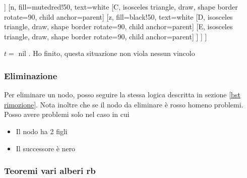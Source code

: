 \begin{itemize}
\begin{minipage}[t]{0.48\linewidth}
\begin{center}
\begin{forest}
				      [p, fill=black!50, text=white
				      [t, fill=mutedred!50, text=white
				      [A, isosceles triangle, draw, shape border rotate=90, child anchor=parent]
				      [B, isosceles triangle, draw, shape border rotate=90, child anchor=parent]
				      ]
				      [n, fill=mutedred!50, text=white
				      [C, isosceles triangle, draw, shape border rotate=90, child anchor=parent]
				      [z, fill=black!50, text=white
				      [D, isosceles triangle, draw, shape border rotate=90, child anchor=parent]
				      [E, isosceles triangle, draw, shape border rotate=90, child anchor=parent]
				      ]
				      ]
				      ]
			      \end{forest}
		      \end{center}
	      \end{minipage}
	      \vskip3mm
	      $ t = \text{ nil } $. Ho finito, questa situazione non viola nessun vincolo
\end{itemize}
\subsubsection{Eliminazione}
Per eliminare un nodo, posso seguire la stessa logica descritta in sezione \ref{bst rimozione}. Nota inoltre che se il nodo da eliminare è rosso homeno problemi. Posso avere problemi solo nel caso in cui
\begin{itemize}
	\item Il nodo ha 2 figli
	\item Il successore è nero
\end{itemize}

\subsubsection{Teoremi vari alberi rb}

